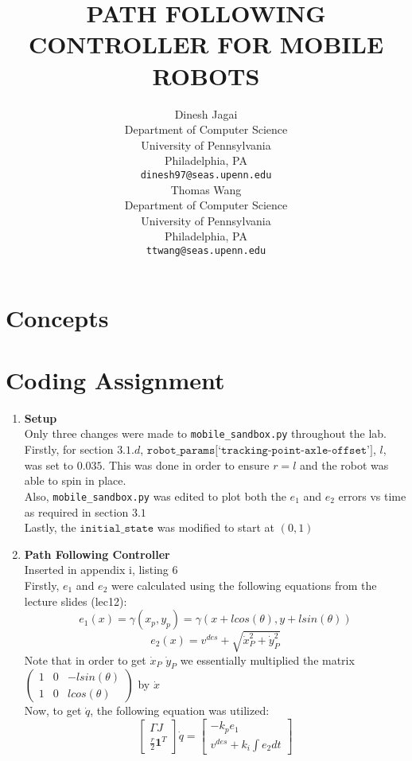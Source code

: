 \documentclass{article}
\title{PATH FOLLOWING CONTROLLER FOR MOBILE ROBOTS}
\author{
  Dinesh Jagai \\
  Department of Computer Science\\
 University of Pennsylvania \\
 Philadelphia, PA \\  
  \texttt{dinesh97@seas.upenn.edu} \\
  \And
  Thomas Wang \\
  Department of Computer Science\\
 University of Pennsylvania \\
 Philadelphia, PA \\  
  \texttt{ttwang@seas.upenn.edu} \\

}
\begin{document}
\maketitle
\section{Concepts}
\section{Coding Assignment}
\begin{enumerate}
    \item
        \textbf{Setup} \\ 
        Only three changes were made to \texttt{mobile\_sandbox.py} throughout the lab. Firstly, for section $3.1.d$,  $\texttt{robot\_params[`tracking-point-axle-offset']}$, $l$, was set to $0.035$. This was done in order to ensure $r = l$ and the robot was able to spin in place. \\
        Also, \texttt{mobile\_sandbox.py} was edited to plot both the $e_1$ and $e_2$ errors vs time as required in section $3.1$ \\
        Lastly, the $\texttt{initial\_state}$ was modified to start at $(0,1)$ \\ 
    \item
        \textbf{Path Following Controller} \\ 
         Inserted in appendix i, listing 6 \\ 
         Firstly, $e_1$ and $e_2$ were calculated using the following equations from the lecture slides (lec12): 
         $$e_1(x) = \gamma(x_p, y_p) = \gamma(x + lcos(\theta), y + lsin(\theta)) $$ 
         $$e_2(x) = v^{des} + \sqrt{\Dot{x}^2_P + \Dot{y}^2_P} $$ 
         Note that in order to get $\Dot{x}_P$ \And $\Dot{y}_P$ we essentially multiplied the matrix  $ \begin{pmatrix}
1 & 0 & -lsin(\theta)\\
1 & 0 & lcos(\theta)
\end{pmatrix} $  by $\Dot{x}$ \\ 
        Now, to get $\Dot{q}$, the following equation was utilized: \\ 
        $$\begin{bmatrix}
\Gamma J\\
\frac{r}{2}\textbf{1}^T
\end{bmatrix} \Dot{q} =  \begin{bmatrix} -k_pe_1\\ v^{des} + k_i \int e_2 dt \end{bmatrix} $$

\end{enumerate}
\end{document}
